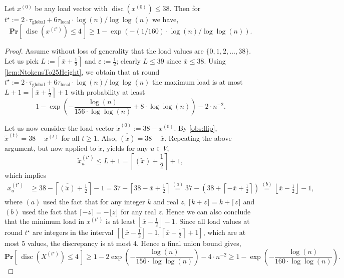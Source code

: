 \documentclass[twoside,leqno]{article}
\newcommand{\Pro}[1]{\mathbf{Pr} \left[\,#1\,\right]}
\DeclareMathOperator{\discr}{\mathrm{disc}}
\DeclareMathOperator{\1}{\mathbf{1}}
\newcommand{\taulocal}{\tau_{\mathrm{local}}}
\newcommand{\tauglobal}{\tau_{\mathrm{global}}}
\numberwithin{equation}{section}
\let\epsilon\varepsilon
\newcommand{\newL}{L}
\begin{document}
\begin{lemma}\label{lem:disc54to4}
Let $x^{(0)}$ be any load vector with $\discr(x^{(0)}) \leq 38$. Then for $t^{\star}:=2 \cdot \tauglobal+ {6\taulocal \cdot \log (n)}/{\log\log(n)}$ we have,
\[
 \Pro{ \discr(x^{(t^{\star})}) \leq 4 } \geq 1 -  \exp\left( - (1/160) \cdot \log (n) / \log \log (n) \right).
\]
\end{lemma}
\begin{proof}
Assume without loss of generality that the load values are $\{0,1,2,\ldots,38\}$.
Let us pick $\newL:=\left\lceil \overline{x} + \frac{1}{2} \right\rceil $ 
and $\epsilon:=\frac{1}{2}$; clearly $\newL\le 39$ since $\overline{x} \leq 38$. 
Using \cref{lem:NtokensTo25Height}, we obtain that at round $t^{\star}:=2 \cdot \tauglobal+ {6\taulocal \cdot \log (n)}/{\log\log(n)}$ the maximum load is at most $\newL+1 = \left\lceil \overline{x}+\frac{1}{2} \right\rceil + 1$ with probability at least 
\[
1-\exp\left(-\frac{\log(n)}{156\cdot \log\log(n)}+ 8\cdot \log\log (n)\right) - 2\cdot n^{-2}.
\]



Let us now consider the load vector $\tilde{x}^{(0)}:=38-x^{(0)}$. 
By \cref{obs:flip}, $\tilde{x}^{(t)}=38-x^{(t)}$ for all $t \geq 1$. Also, $\overline{(\tilde{x})} = 38 - \overline{x}$. Repeating the above argument, but now applied to $\tilde{x}$,
yields for any $u \in V$,
 \[
 \tilde{x}_u^{(t^{\star})} \leq L+1 = \left\lceil \overline{(\tilde{x})}+\frac{1}{2} \right\rceil + 1,
\]
which implies
\begin{align*}
 x_u^{(t^{\star})} &\geq 38- \left\lceil \overline{(\tilde{x})}+\frac{1}{2} \right\rceil - 1 = 37- \left\lceil 38 - \overline{x} +\frac{1}{2} \right\rceil  \stackrel{(a)}{=} 37 - \left(38 + \left\lceil -\overline{x} + \frac{1}{2} \right\rceil \right)   \stackrel{(b)}{=} \left\lfloor \overline{x} - \frac{1}{2} \right\rfloor - 1,
\end{align*}
where $(a)$ used the fact that for any integer $k$ and real $z$, $\lceil k + z \rceil = k + \lceil z \rceil$ and $(b)$ used the fact that $\lceil -z \rceil = -\lfloor z \rfloor$ for any real $z$. Hence we can also conclude that the minimum load in $x^{(t^{\star})}$ is at least $\left\lfloor \overline{x} - \frac{1}{2} \right\rfloor - 1$.
Since all load values at round $t^{\star}$ are integers in the interval $\left[ \left\lfloor \overline{x}-\frac{1}{2} \right\rfloor - 1, 
\left\lceil \overline{x}+\frac{1}{2} \right\rceil + 1 \right]$, which are at most $5$ values, the discrepancy is at most $4$. Hence a final union bound gives, 
\[
\Pro{\discr(X^{(t^{\star})})\le 4}
 \ge 1-2\exp\left(-\frac{\log(n)}{156\cdot \log\log(n)}\right) - 4\cdot n^{-2} \ge 1-\exp\left(-\frac{\log(n)}{160\cdot \log\log(n)}\right).\]
\end{proof}
\end{document}
